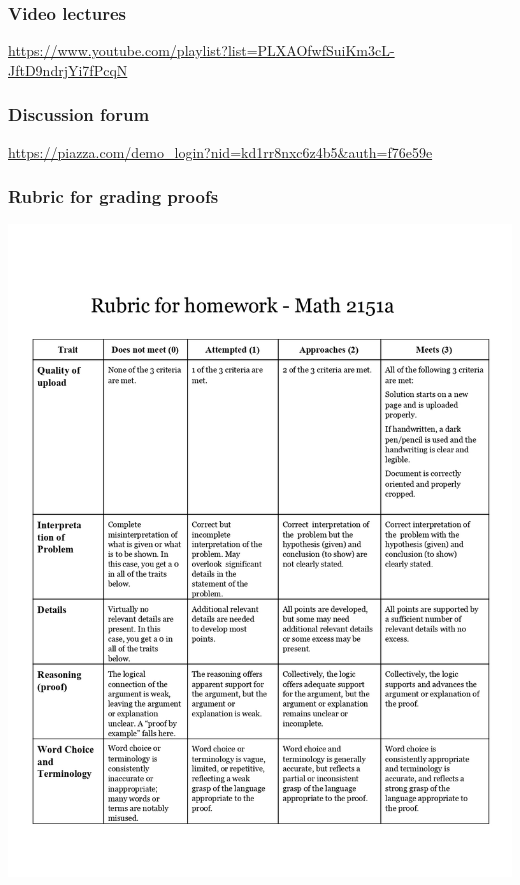 \documentclass[
]{report}
\begin{document}
\hypertarget{video-lectures}{%
\subsubsection{Video lectures}\label{video-lectures}}

\url{https://www.youtube.com/playlist?list=PLXAOfwfSuiKm3cL-JftD9ndrjYi7fPcqN}

\hypertarget{discussion-forum}{%
\subsubsection{Discussion forum}\label{discussion-forum}}

\url{https://piazza.com/demo_login?nid=kd1rr8nxc6z4b5\&auth=f76e59e}

\hypertarget{rubric-for-grading-proofs}{%
\subsubsection{Rubric for grading proofs}\label{rubric-for-grading-proofs}}

\includegraphics{images/Rubric for homework - Math 2151a_page-0001.jpg}
\end{document}
